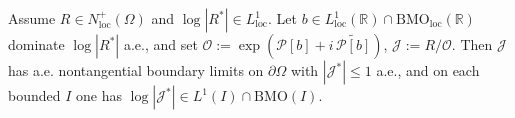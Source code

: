 \begin{theorem}\label{hp:thm:J-global}
Assume $R\in N^+_{\mathrm{loc}}(\Omega)$ and $\log|R^*|\in L^1_{\mathrm{loc}}$.
Let $b\in L^1_{\mathrm{loc}}(\mathbb{R})\cap \mathrm{BMO}_{\mathrm{loc}}(\mathbb{R})$ dominate $\log|R^*|$ a.e., and set $\mathcal O:=\exp(\mathcal P[b]+i\,\widetilde{\mathcal P[b]})$, $\mathcal J:=R/\mathcal O$.
Then $\mathcal J$ has a.e. nontangential boundary limits on $\partial\Omega$ with $|\mathcal J^*|\le1$ a.e., and on each bounded $I$ one has $\log|\mathcal J^*|\in L^1(I)\cap \mathrm{BMO}(I)$.
\end{theorem}


